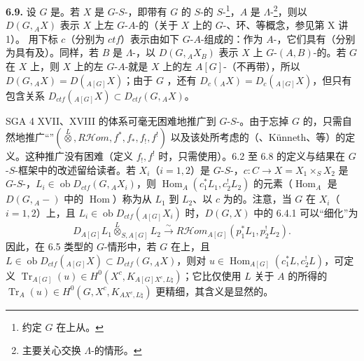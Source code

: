 \textbf{6.9.} 设 $G$ 是。若 $X$ 是 $G$-$S$-，即带有 $G$ 的 $S$-的 $S$-\footnote{约定 $G$ 在上从。}，$A$ 是 $\Lambda$-\footnote{主要关心交换 $\Lambda$-的情形。}，则以 $D(G,{}_AX)$ 表示 $X$ 上左 $G$-$A$-的（关于 $X$ 上的 $G$-、环、等概念，参见第 X 讲 1）。
用下标 $c$（分别为 $ctf$）表示由如下 $G$-$A$-组成的：作为 $A$-，它们具有（分别为具有及）。同样，若 $B$ 是 $\Lambda$-，以 $D(G,{}_AX_B)$ 表示 $X$ 上 $G$-$(A,B)$-的。若 $G$ 在 $X$ 上，则 $X$ 上的左 $G$-$A$-就是 $X$ 上的左 $A[G]$-（不再带），所以 $D(G,{}_AX)=D({}_{A[G]}X)$；由于 $G$ ，还有 $D_c({}_AX)=D_c({}_{A[G]}X)$，但只有包含关系 $D_{ctf}({}_{A[G]}X)\subset D_{ctf}(G,{}_AX)$。

SGA 4 XVII、XVIII 的体系可毫无困难地推广到 $G$-$S$-。由于忘掉 $G$ 的，只需自然地推广“”$(\overset L\otimes,R\mathcal H\!om,f^*,f_*,f_!,f^!)$ 以及该处所考虑的（、Künneth、等）的定义。这种推广没有困难（定义 $f_!,f^!$ 时，只需使用）。6.2 至 6.8 的定义与结果在 $G$-$S$-框架中的改述留给读者。若 $X_i$（$i=1,2$）是 $G$-$S$-，$c:C\to X=X_1\times_SX_2$ 是 $G$-$S$-，$L_i\in\operatorname{ob}D_{ctf}(G,{}_AX_i)$，则 $\operatorname{Hom}_A(c_1^*L_1,c_2^!L_2)$ 的元素（$\operatorname{Hom}_A$ 是 $D(G,{}_A-)$ 中的 $\operatorname{Hom}$）称为从 $L_1$ 到 $L_2$、以 $c$ 为的。注意，当 $G$ 在 $X_i$（$i=1,2$）上，且 $L_i\in\operatorname{ob}D_{ctf}({}_{A[G]}X_i)$ 时，$D(G,X)$ 中的 6.4.1 可以“细化”为
\[D_{A[G]}L_1\overset L\otimes_{S,A[G]}L_2\xrightarrow\sim R\mathcal H\!om_{A[G]}(p_1^*L_1,p_2^!L_2).\]
因此，在 6.5 类型的 $G$-情形中，若 $G$ 在上，且 $L\in\operatorname{ob}D_{ctf}({}_{A[G]}X)\subset D_{ctf}(G,{}_AX)$，则对 $u\in\operatorname{Hom}_{A[G]}(c_1^*L,c_2^!L)$，可定义 $\operatorname{Tr}_{A[G]}(u)\in H^0(X^c,K_{A[G]X^c,L\natural})$；它比仅使用 $L$ 关于 $A$ 的所得的 $\operatorname{Tr}_A(u)\in H^0(G,X^c,K_{AX^c,L\natural})$ 更精细，其含义是显然的。

